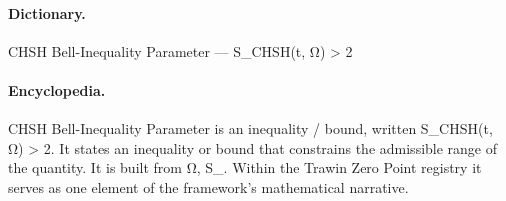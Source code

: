 \paragraph{Dictionary.}
CHSH Bell-Inequality Parameter — S\_CHSH(t, Ω) > 2

\paragraph{Encyclopedia.}
CHSH Bell-Inequality Parameter is an inequality / bound, written S\_CHSH(t, Ω) > 2. It states an inequality or bound that constrains the admissible range of the quantity. It is built from Ω, S\_. Within the Trawin Zero Point registry it serves as one element of the framework's mathematical narrative.
